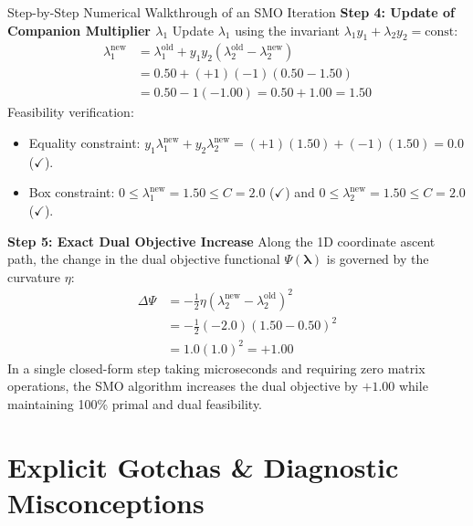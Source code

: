 \begin{examplebox}[breakable]{Step-by-Step Numerical Walkthrough of an SMO Iteration}
\textbf{Step 4: Update of Companion Multiplier $\lambda_1$}
Update $\lambda_1$ using the invariant $\lambda_1 y_1 + \lambda_2 y_2 = \text{const}$:
\begin{align}
\lambda_1^{\text{new}} &= \lambda_1^{\text{old}} + y_1 y_2 \left( \lambda_2^{\text{old}} - \lambda_2^{\text{new}} \right) \nonumber \\
&= 0.50 + (+1)(-1)\left( 0.50 - 1.50 \right) \nonumber \\
&= 0.50 - 1(-1.00) = 0.50 + 1.00 = 1.50
\end{align}
Feasibility verification:
\begin{itemize}
    \item Equality constraint: $y_1 \lambda_1^{\text{new}} + y_2 \lambda_2^{\text{new}} = (+1)(1.50) + (-1)(1.50) = 0.0$ ($\checkmark$).
    \item Box constraint: $0 \le \lambda_1^{\text{new}} = 1.50 \le C = 2.0$ ($\checkmark$) and $0 \le \lambda_2^{\text{new}} = 1.50 \le C = 2.0$ ($\checkmark$).
\end{itemize}

\textbf{Step 5: Exact Dual Objective Increase}
Along the 1D coordinate ascent path, the change in the dual objective functional $\Psi(\boldsymbol{\lambda})$ is governed by the curvature $\eta$:
\begin{align}
\Delta \Psi &= -\frac{1}{2} \eta \left( \lambda_2^{\text{new}} - \lambda_2^{\text{old}} \right)^2 \nonumber \\
&= -\frac{1}{2}(-2.0)\left( 1.50 - 0.50 \right)^2 \nonumber \\
&= 1.0 \left( 1.0 \right)^2 = +1.00
\end{align}
In a single closed-form step taking microseconds and requiring zero matrix operations, the SMO algorithm increases the dual objective by $+1.00$ while maintaining 100\% primal and dual feasibility.
\end{examplebox}

\section{Explicit Gotchas \& Diagnostic Misconceptions}

